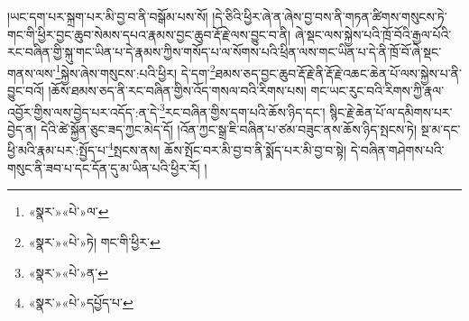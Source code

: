 །ཡང་དག་པར་སྐྲག་པར་མི་བྱ་བ་ནི་བསྒོམ་པས་སོ། །དེ་ཅིའི་ཕྱིར་ཞེ་ན་ཞེས་བྱ་བས་ནི་གཏན་ཚིགས་གསུངས་ཏེ་གང་གི་ཕྱིར་བྱང་ཆུབ་སེམས་དཔའ་རྣམས་བྱང་ཆུབ་རྡོ་རྗེ་ལས་བྱུང་བ་ནི། ཞེ་སྡང་ལས་སྐྱེས་པའི་ཁྲོ་བོའི་རྒྱལ་པོའི་རང་བཞིན་གྱི་སྐུ་གང་ཡིན་པ་དེ་རྣམས་ཀྱིས་གསོད་པ་ལ་སོགས་པའི་ཕྲིན་ལས་གང་ཡིན་པ་དེ་ནི་ཁྲོ་བོ་ཞེ་སྡང་གནས་ལས་\footnote{«སྣར་»«པེ་»ལ་}སྐྱེས་ཞེས་གསུངས་:པའི་ཕྱིར། དེ་དག་\footnote{«སྣར་»«པེ་»ཏེ། གང་གི་ཕྱིར་}ཐམས་ཅད་བྱང་ཆུབ་རྡོ་རྗེ་ནི་རྡོ་རྗེ་འཆང་ཆེན་པོ་ལས་སྐྱེས་པ་ནི་བྱུང་བའོ། །ཆོས་ཐམས་ཅད་ནི་རང་བཞིན་གྱིས་འོད་གསལ་བའི་རིགས་པས། གང་ཡང་རུང་བའི་རིགས་ཀྱི་རྣལ་འབྱོར་གྱིས་ལས་བྱེད་པར་འདོད་:ན་དེ་\footnote{«སྣར་»«པེ་»ན་}རང་བཞིན་གྱིས་དག་པའི་ཆོས་ཉིད་དང་། སྙིང་རྗེ་ཆེན་པོ་ལ་དམིགས་པར་བྱེད་ན། དེའི་ཚེ་སྐྱོན་ཅུང་ཟད་ཀྱང་མེད་དོ། །འོན་ཀྱང་སྒྲ་ཇི་བཞིན་པ་ཙམ་བཟུང་ནས་ཆོས་ཉིད་སྤངས་ཏེ། སྔ་མ་དང་ཕྱི་མའི་རྣམ་པར་:སྤྱོད་པ་\footnote{«སྣར་»«པེ་»དཔྱོད་པ་}སྤངས་ནས། ཆོས་སྤོང་བར་མི་བྱ་བ་ནི་སྨོད་པར་མི་བྱ་བ་སྟེ། དེ་བཞིན་གཤེགས་པའི་གསུང་ནི་ཟབ་པ་དང་དོན་དུ་མ་ཡིན་པའི་ཕྱིར་རོ། །
